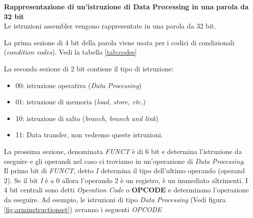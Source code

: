 \begin{defn}
    \textbf{Rappresentazione di un'istruzione di Data Processing in una parola da 32 bit} \\
    Le istruzioni assembler vengono rappresentate in una parola da 32 bit.

    La prima sezione di 4 bit della parola viene usata per i codici di condizionali (\textit{condition codes}).
    Vedi la tabella \ref{tab:codes}

    La seconda sezione di 2 bit contiene il tipo di istruzione:
    \begin{itemize}
        \item 00: istruzione operativa (\textit{Data Processing})
        \item 01: istruzione di memoria (\textit{load, store, etc.})
        \item 10: istruzione di salto (\textit{branch, branch and link})
        \item 11: Data transfer, non vedremo queste istruzioni.
    \end{itemize}

    La prossima sezione, denominata \textit{FUNCT} è di 6 bit e determina l'istruzione da eseguire e gli operandi nel caso ci troviamo in un'operazione di \textit{Data Processing}.
    Il primo bit di \textit{FUNCT}, detto \textit{I} determina il tipo dell'ultimo operando (operand 2).
    Se il bit \textit{I} è a 0 allora l'operando 2 è un registro, è un immediato altrimenti.
    I 4 bit centrali sono detti \textit{Operation Code} o \textbf{OPCODE} e determinano l'operazione da eseguire.
    Ad esempio, le istruzioni di tipo \textit{Data Processing} (Vedi figura \ref{fig:arminstructionset}) avranno i seguenti \textit{OPCODE}


\end{defn}
